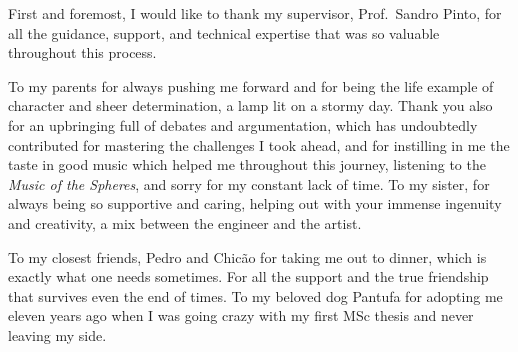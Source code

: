 
%

\begin{ntacknowledgements}

First and foremost, I would like to thank my supervisor, Prof.~Sandro Pinto, for
all the guidance, support, and technical expertise that was so valuable
throughout this process.

To my parents for always pushing me forward and for being the life example of character and sheer determination, a
lamp lit on a stormy day. Thank you also for an upbringing full of debates and
argumentation, which has undoubtedly contributed for mastering the challenges I
took ahead, and for instilling in me the taste in good music which helped me
throughout this journey, listening to the \emph{Music of the Spheres},
and sorry for my constant lack of time.
To my sister, for always being so supportive and caring, helping out with your
immense ingenuity and creativity, a mix between the engineer and the artist.

To my closest friends, Pedro and Chicão for taking me out to dinner, which is exactly what one needs sometimes. For all the support and
the true friendship that survives even the end of times. To my beloved dog
Pantufa for adopting me eleven years ago when I was going crazy with my
first MSc thesis and never leaving my side.

\end{ntacknowledgements}
